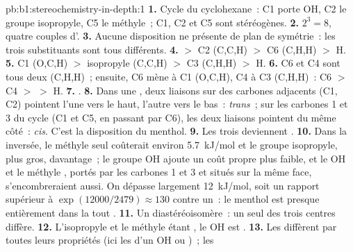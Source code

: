 \begin{solution}{pb:b1:stereochemistry-in-depth:1}
\textbf{1.} Cycle du cyclohexane~: C1 porte OH, C2 le groupe isopropyle,
C5 le méthyle~; C1, C2 et C5 sont stéréogènes.
\textbf{2.} $2^3 = 8$, quatre couples d'.
\textbf{3.} Aucune disposition ne présente de plan de symétrie~: les
trois substituants sont tous différents.
\textbf{4.}  $>$ C2 (C,C,H) $>$ C6 (C,H,H) $>$ H.
\textbf{5.} C1 (O,C,H) $>$ isopropyle (C,C,H) $>$ C3 (C,H,H) $>$ H.
\textbf{6.} C6 et C4 sont tous deux (C,H,H)~; ensuite, C6 mène à C1
(O,C,H), C4 à C3
(C,H,H)~: C6 $>$ C4 $>$  $>$ H.
\textbf{7.} .
\textbf{8.} Dans une , deux liaisons  sur des carbones
adjacents (C1, C2) pointent l'une vers le haut, l'autre vers le bas~:
\textit{trans}~; sur les carbones 1 et 3 du cycle (C1 et C5, en passant
par C6), les deux liaisons  pointent du même côté~:
\textit{cis}. C'est la disposition du menthol.
\textbf{9.} Les trois deviennent .
\textbf{10.} Dans la  inversée, le méthyle seul coûterait environ
\qty{5.7}{kJ/mol} et le groupe isopropyle, plus gros, davantage~; le
groupe OH ajoute un coût propre plus faible, et le OH et le méthyle
, portés par les carbones 1 et 3 et situés sur la même face,
s'encombreraient aussi. On dépasse largement \qty{12}{kJ/mol}, soit un
rapport supérieur à $\exp(12000/2479) \approx 130$ contre un~: le
menthol est presque entièrement dans la  tout .
\textbf{11.} Un diastéréoisomère~: un seul des trois centres diffère.
\textbf{12.} L'isopropyle et le méthyle étant , le OH est
.
\textbf{13.} Les  diffèrent par toutes leurs propriétés
(ici les  d'un OH  ou )~; les

\end{solution}
